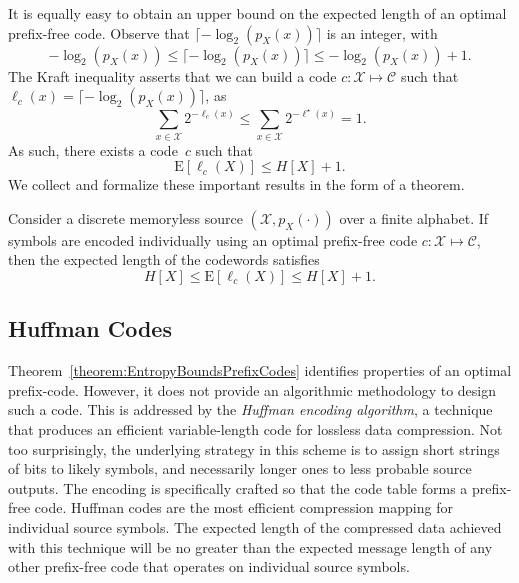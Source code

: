 It is equally easy to obtain an upper bound on the expected length of an optimal prefix-free code.
Observe that $\lceil - \log_2 (p_X(x)) \rceil$ is an integer, with
\begin{equation*}
- \log_2 (p_X(x))
\leq \lceil - \log_2 (p_X(x)) \rceil
\leq - \log_2 (p_X(x)) + 1 .
\end{equation*}
The Kraft inequality asserts that we can build a code $c : \mathcal{X} \mapsto \mathcal{C}$ such that $\ell_c(x) = \lceil - \log_2 (p_X(x)) \rceil$, as
\begin{equation*}
\sum_{x \in \mathcal{X}} 2^{- \ell_c(x)}
\leq \sum_{x \in \mathcal{X}} 2^{- \ell^{\star}(x)} = 1 .
\end{equation*}
As such, there exists a code~$c$ such that
\begin{equation*}
\mathrm{E} [\ell_c(X)] \leq H[X] + 1 .
\end{equation*}
We collect and formalize these important results in the form of a theorem.

\begin{theorem} \label{theorem:EntropyBoundsPrefixCodes}
Consider a discrete memoryless source $(\mathcal{X}, p_X(\cdot))$ over a finite alphabet.
If symbols are encoded individually using an optimal prefix-free code $c : \mathcal{X} \mapsto \mathcal{C}$, then the expected length of the codewords satisfies
\begin{equation*}
H[X] \leq \mathrm{E} [\ell_c(X)] \leq H[X] + 1 .
\end{equation*}
\end{theorem}


\subsection{Huffman Codes}

Theorem~\ref{theorem:EntropyBoundsPrefixCodes} identifies properties of an optimal prefix-code.
However, it does not provide an algorithmic methodology to design such a code.
This is addressed by the \emph{Huffman encoding algorithm}, a technique that produces an efficient variable-length code for lossless data compression.
Not too surprisingly, the underlying strategy in this scheme is to assign short strings of bits to likely symbols, and necessarily longer ones to less probable source outputs.
The encoding is specifically crafted so that the code table forms a prefix-free code.
Huffman codes are the most efficient compression mapping for individual source symbols.
The expected length of the compressed data achieved with this technique will be no greater than the expected message length of any other prefix-free code that operates on individual source symbols.

